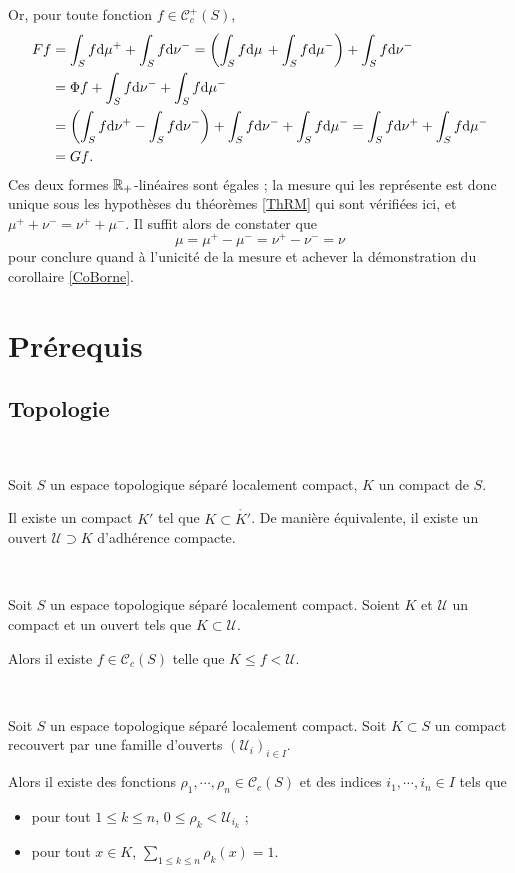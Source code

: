 \documentclass{article}
\begin{document}
Or, pour toute fonction $f\in\mathcal C_c^+(S)$,
\begin{align*}
Ff &= \int_Sf\mathrm{d}\mu^++\int_Sf\mathrm{d}\nu^-
    = \left(\int_Sf\mathrm{d}\mu\,+\int_Sf\mathrm{d}\mu^-\right)+\int_Sf\mathrm{d}\nu^-\\
   &= \Phi f+\int_Sf\mathrm{d}\nu^-+\int_Sf\mathrm{d}\mu^-\\
   &= \left(\int_Sf\mathrm{d}\nu^+-\int_Sf\mathrm{d}\nu^-\right)+\int_Sf\mathrm{d}\nu^-+\int_Sf\mathrm{d}\mu^-
    = \int_Sf\mathrm{d}\nu^++\int_Sf\mathrm{d}\mu^-\\
   &= Gf\text.
\end{align*}
Ces deux formes $\mathbb{R}_+$-linéaires sont égales ; la mesure qui les représente est donc unique sous les hypothèses du théorèmes \ref{ThRM} qui sont vérifiées ici, et $\mu^++\nu^-=\nu^++\mu^-$. Il suffit alors de constater que
$$\mu=\mu^+-\mu^-=\nu^+-\nu^-=\nu$$
pour conclure quand à l'unicité de la mesure et achever la démonstration du corollaire \ref{CoBorne}.

\section{Prérequis}
\subsection{Topologie}

\begin{Thm}~
\label{OuvertCompact}

Soit $S$ un espace topologique séparé localement compact, $K$ un compact de $S$.

Il existe un compact $K'$ tel que $K\subset\mathring{K'}$. De manière équivalente, il existe un ouvert $\mathcal U\supset K$ d'adhérence compacte.
\end{Thm}

\begin{Thm}~
\label{Normal}

Soit $S$ un espace topologique séparé localement compact. Soient $K$ et $\mathcal U$ un compact et un ouvert tels que $K\subset\mathcal U$.

Alors il existe $f\in\mathcal C_c(S)$ telle que $K\leq f<\mathcal U$.
\end{Thm}

\begin{Thm}~
\label{Partition}

Soit $S$ un espace topologique séparé localement compact. Soit $K\subset S$ un compact recouvert par une famille d'ouverts $(\mathcal U_i)_{i\in I}$.

Alors il existe des fonctions $\rho_1,\cdots,\rho_n\in\mathcal C_c(S)$ et des indices $i_1,\cdots,i_n\in I$ tels que
\begin{itemize}
\item pour tout $1\leq k\leq n$, $0\leq\rho_k<\mathcal U_{i_k}$ ;
\item pour tout $x\in K$, $\sum_{1\leq k\leq n}\rho_k(x)=1$.
\end{itemize}
\end{Thm}
\end{document}
